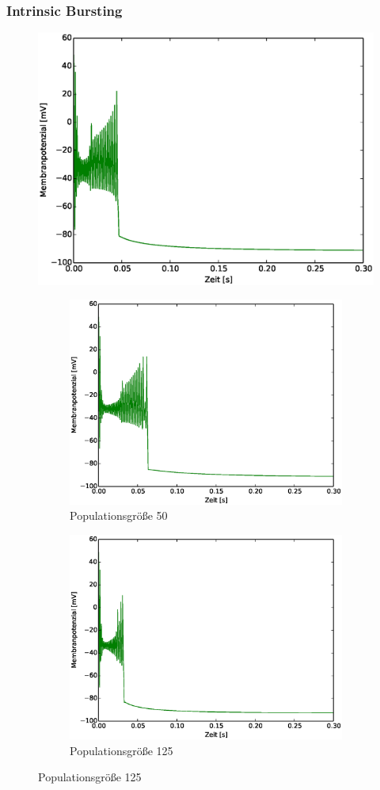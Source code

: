 \begin{frame}
  \frametitle{Intrinsic Bursting}
  \begin{figure}
    \centering
    \includegraphics[viewport=19 10 532 394,width=0.35\linewidth]{genetic/ib-pop200.eps}
    \caption*{Populationsgröße 200}
    \begin{subfigure}{.5\textwidth}
      \centering
      \includegraphics*[viewport=19 10 532 394,width=0.7\linewidth]{genetic/ib-pop50.eps}
      \caption*{Populationsgröße 50}
    \end{subfigure}%
    \begin{subfigure}{.5\textwidth}
      \centering
      \includegraphics*[viewport=19 10 532 394,width=0.7\linewidth]{genetic/ib-base.eps}
      \caption*{Populationsgröße 125}
    \end{subfigure}
  \end{figure}
\end{frame}

